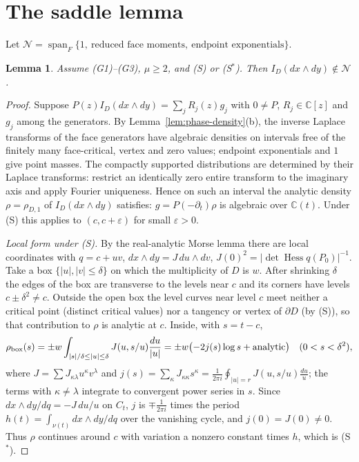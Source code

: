\documentclass[11pt]{article}
\numberwithin{equation}{section}
\newtheorem{lemma}[lemma]{Lemma}
\theoremstyle{definition}
\theoremstyle{remark}
\newcommand{\C}{\mathbb C}
\newcommand{\Span}{\operatorname{span}}
\newcommand{\Ncal}{\mathcal N}
\begin{document}
\section{The saddle lemma}

Let $\Ncal=\Span_F\{1,\ \text{reduced face moments},\ \text{endpoint exponentials}\}$.

\begin{lemma}\label{lem:saddle}
Assume \textup{(G1)--(G3)}, $\mu\ge2$, and \textup{(S)} or \textup{(S$^*$)}. Then
$I_D(dx\wedge dy)\notin\Ncal$.
\end{lemma}
\begin{proof}
Suppose $P(z)I_D(dx\wedge dy)=\sum_jR_j(z)g_j$ with $0\ne P$, $R_j\in\C[z]$ and
$g_j$ among the generators. By Lemma~\ref{lem:phase-density}(b), the inverse Laplace transforms of
the face generators have algebraic densities on intervals free of the
finitely many face-critical, vertex and zero values; endpoint
exponentials and $1$ give point masses.  The compactly supported
distributions are determined by their Laplace transforms: restrict an
identically zero entire transform to the imaginary axis and apply Fourier
uniqueness. Hence on such an interval the analytic density
$\rho=\rho_{D,1}$ of $I_D(dx\wedge dy)$ satisfies:
$g=P(-\partial_t)\rho$ is algebraic over $\C(t)$. Under (S) this applies to
$(c,c+\varepsilon)$ for small $\varepsilon>0$.

\emph{Local form under (S).} By the real-analytic Morse lemma there are local
coordinates with $q=c+uv$, $dx\wedge dy=J\,du\wedge dv$,
$J(0)^2=|\det\operatorname{Hess}q(P_0)|^{-1}$. Take a box
$\{|u|,|v|\le\delta\}$ on which the multiplicity of $D$ is $w$. After shrinking $\delta$ the edges of the box are transverse to the levels near
$c$ and its corners have levels $c\pm\delta^2\ne c$. Outside the open
box the level curves near level $c$ meet neither a critical point (distinct
critical values) nor a tangency or vertex of $\partial D$ (by (S)), so that
contribution to $\rho$ is analytic at $c$. Inside, with $s=t-c$,
\[
 \rho_{\rm box}(s)=\pm w\int_{|s|/\delta\le|u|\le\delta}J(u,s/u)\frac{du}{|u|}
 =\pm w\bigl(-2j(s)\log s+\text{analytic}\bigr)\quad(0<s<\delta^2),
\]
where $J=\sum J_{\kappa\lambda}u^\kappa v^\lambda$ and $j(s)=\sum_\kappa J_{\kappa\kappa}s^\kappa
=\frac1{2\pi i}\oint_{|u|=r}J(u,s/u)\frac{du}u$; the terms with
$\kappa\ne\lambda$ integrate to convergent power series in $s$. Since
$dx\wedge dy/dq=-J\,du/u$ on $C_t$, $j$ is $\mp\frac1{2\pi i}$ times the period
$h(t)=\int_{\nu(t)}dx\wedge dy/dq$ over the vanishing cycle, and $j(0)=J(0)\ne0$.
Thus $\rho$ continues around $c$ with variation a nonzero constant times $h$,
which is (S$^*$).


\end{proof}
\end{document}
